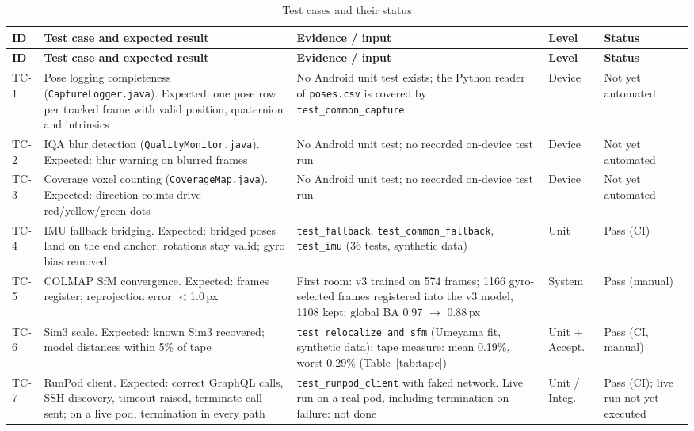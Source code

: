 {\footnotesize\setlength{\tabcolsep}{3pt}
\begin{longtable}{p{}p{}p{}p{}p{}}
\caption{Test cases and their status}\label{tab:testcases}\\
\toprule
\textbf{ID} & \textbf{Test case and expected result} & \textbf{Evidence / input} & \textbf{Level} & \textbf{Status} \\
\midrule
\endfirsthead
\toprule
\textbf{ID} & \textbf{Test case and expected result} & \textbf{Evidence / input} & \textbf{Level} & \textbf{Status} \\
\midrule
\endhead
TC-1 & Pose logging completeness (\texttt{CaptureLogger.java}). Expected: one pose row per tracked frame with valid position, quaternion and intrinsics & No Android unit test exists; the Python reader of \texttt{poses.csv} is covered by \texttt{test\_common\_capture} & Device & Not yet automated \\
TC-2 & IQA blur detection (\texttt{QualityMonitor.java}). Expected: blur warning on blurred frames & No Android unit test; no recorded on-device test run & Device & Not yet automated \\
TC-3 & Coverage voxel counting (\texttt{CoverageMap.java}). Expected: direction counts drive red/yellow/green dots & No Android unit test; no recorded on-device test run & Device & Not yet automated \\
TC-4 & IMU fallback bridging. Expected: bridged poses land on the end anchor; rotations stay valid; gyro bias removed & \texttt{test\_fallback}, \texttt{test\_common\_fallback}, \texttt{test\_imu} (36 tests, synthetic data) & Unit & Pass (CI) \\
TC-5 & COLMAP SfM convergence. Expected: frames register; reprojection error $<$1.0\,px & First room: v3 trained on 574 frames; 1166 gyro-selected frames registered into the v3 model, 1108 kept; global BA 0.97 $\rightarrow$ 0.88\,px & System & Pass (manual) \\
TC-6 & Sim3 scale. Expected: known Sim3 recovered; model distances within 5\% of tape & \texttt{test\_relocalize\_and\_sfm} (Umeyama fit, synthetic data); tape measure: mean 0.19\%, worst 0.29\% (Table~\ref{tab:tape}) & Unit + Accept. & Pass (CI, manual) \\
TC-7 & RunPod client. Expected: correct GraphQL calls, SSH discovery, timeout raised, terminate call sent; on a live pod, termination in every path & \texttt{test\_runpod\_client} with faked network. Live run on a real pod, including termination on failure: not done & Unit / Integ. & Pass (CI); live run not yet executed \\

\end{longtable}}
